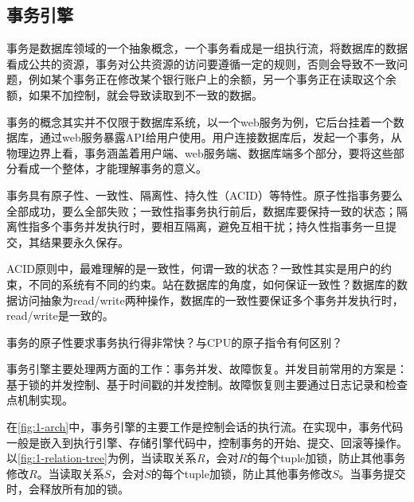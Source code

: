 \subsection{事务引擎}

事务是数据库领域的一个抽象概念，一个事务看成是一组执行流，将数据库的数据看成公共的资源，事务对公共资源的访问要遵循一定的规则，否则会导致不一致问题，例如某个事务正在修改某个银行账户上的余额，另一个事务正在读取这个余额，如果不加控制，就会导致读取到不一致的数据。

事务的概念其实并不仅限于数据库系统，以一个web服务为例，它后台挂着一个数据库，通过web服务暴露API给用户使用。用户连接数据库后，发起一个事务，从物理边界上看，事务涵盖着用户端、web服务端、数据库端多个部分，要将这些部分看成一个整体，才能理解事务的意义。

事务具有原子性、一致性、隔离性、持久性（ACID）等特性。原子性指事务要么全部成功，要么全部失败；一致性指事务执行前后，数据库要保持一致的状态；隔离性指多个事务并发执行时，要相互隔离，避免互相干扰；持久性指事务一旦提交，其结果要永久保存。

ACID原则中，最难理解的是一致性，何谓一致的状态？一致性其实是用户的约束，不同的系统有不同的约束。站在数据库的角度，如何保证一致性？数据库的数据访问抽象为read/write两种操作，数据库的一致性要保证多个事务并发执行时，read/write是一致的。

\begin{exercise}
    事务的原子性要求事务执行得非常快？与CPU的原子指令有何区别？
\end{exercise}

事务引擎主要处理两方面的工作：事务并发、故障恢复。并发目前常用的方案是：基于锁的并发控制、基于时间戳的并发控制。故障恢复则主要通过日志记录和检查点机制实现。

在\figurename\ref{fig:1-arch}中，事务引擎的主要工作是控制会话的执行流。在实现中，事务代码一般是嵌入到执行引擎、存储引擎代码中，控制事务的开始、提交、回滚等操作。以\figurename\ref{fig:1-relation-tree}为例，当读取关系$R$，会对$R$的每个tuple加锁，防止其他事务修改$R$。当读取关系$S$，会对$S$的每个tuple加锁，防止其他事务修改$S$。当事务提交时，会释放所有加的锁。

